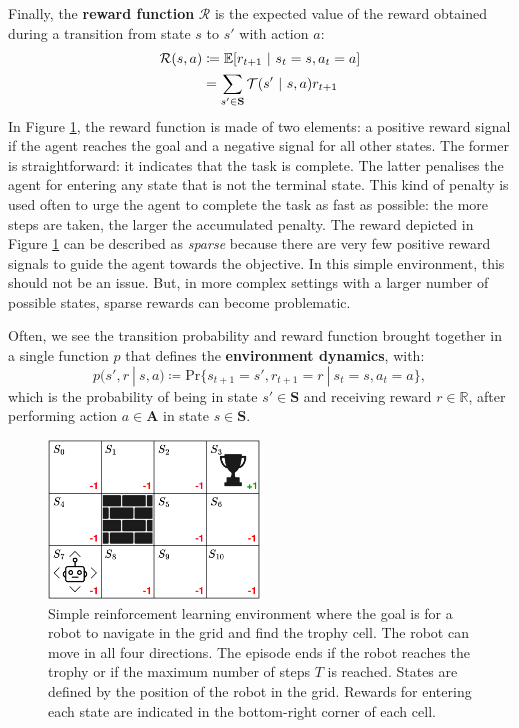 Finally, the \textbf{reward function} $\mathcal{R}$ is the expected value of the reward obtained during a transition from state $s$ to $s'$ with action $a$:
\begin{align}\label{eq:RewardFunc}
    \mathcal{R}(s,a)&\coloneqq\mathbb{E}[r_{t+1}\ |\ s_t=s,a_t=a]\notag\\
        &=\sum_{s'\in\mathbf{S}}\mathcal{T}(s'\ |\ s,a)r_{t+1}
\end{align}
In Figure \ref{fig:rl-toy}, the reward function is made of two elements: a positive reward signal if the agent reaches the goal and a negative signal for all other states. The former is straightforward: it indicates that the task is complete. The latter penalises the agent for entering any state that is not the terminal state. This kind of penalty is used often to urge the agent to complete the task as fast as possible: the more steps are taken, the larger the accumulated penalty. The reward depicted in Figure \ref{fig:rl-toy} can be described as \textit{sparse} because there are very few positive reward signals to guide the agent towards the objective. In this simple environment, this should not be an issue. But, in more complex settings with a larger number of possible states, sparse rewards can become problematic.

Often, we see the transition probability and reward function brought together in a single function $p$ that defines the \textbf{environment dynamics}, with:
\begin{equation}
    p(s',r\ |\ s,a)\coloneqq \text{Pr}\{s_{t+1}=s',r_{t+1}=r\ |\ s_t=s,a_t=a\},
    \label{eq:EnvDyn}
\end{equation}
which is the probability of being in state $s'\in\mathbf{S}$ and receiving reward $r\in\mathbb{R}$, after performing action $a\in\mathbf{A}$ in state $s\in\mathbf{S}$.

\begin{figure}
    \centering
    \includegraphics[width=0.5\textwidth]{Figures/RL/rl-toy.png}
    \caption{Simple reinforcement learning environment where the goal is for a robot to navigate in the grid and find the trophy cell. The robot can move in all four directions. The episode ends if the robot reaches the trophy or if the maximum number of steps $T$ is reached. States are defined by the position of the robot in the grid. Rewards for entering each state are indicated in the bottom-right corner of each cell.}
    \label{fig:rl-toy}
\end{figure}





